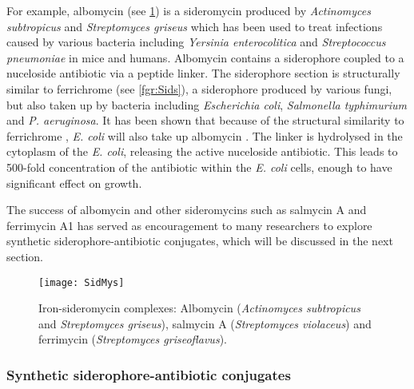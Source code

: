 For example, albomycin  (see \ref{fgr:SidMys}) is a sideromycin produced by \textit{Actinomyces subtropicus} and \textit{Streptomyces griseus}\cite{Hartmann1979,Fiedler1985} which has been used to treat infections caused by various bacteria including \textit{Yersinia enterocolitica} and \textit{Streptococcus pneumoniae} in mice and humans\cite{Gause1955,Pramanik2007}. 
Albomycin  contains a siderophore coupled to a nuceloside antibiotic via a peptide linker. 
The siderophore section is structurally similar to ferrichrome  (see \ref{fgr:Sids}), a siderophore produced by various fungi, but also taken up by bacteria including \textit{Escherichia coli}, \textit{Salmonella typhimurium} and \textit{P. aeruginosa}\cite{vanderHelm1980,Hannauer2010}.
It has been shown that because of the structural similarity to ferrichrome , \textit{E. coli} will also take up albomycin \cite{Hartmann1979}.
The linker is hydrolysed in the cytoplasm of the \textit{E. coli}, releasing the active nuceloside antibiotic. This leads to 500-fold concentration of the antibiotic within the \textit{E. coli} cells, enough to have significant effect on growth.

The success of albomycin\cite{Gause1955} and other sideromycins such as salmycin A\cite{Hider2010,Vertesy1995,Braun2009} and ferrimycin A1\cite{Sackmann1962,Gottlieb2012} has served as encouragement to many researchers to explore synthetic siderophore-antibiotic conjugates, which will be discussed in the next section. 

\begin{figure}[H]
	\begin{center}
		\texttt{[image: SidMys]}
		\caption{Iron-sideromycin complexes: Albomycin \cite{Benz1982,Hider2010} (\textit{Actinomyces subtropicus} and \textit{Streptomyces griseus}), salmycin A\cite{Hider2010,Vertesy1995,Braun2009} (\textit{Streptomyces violaceus}) and ferrimycin\cite{Hider2010} (\textit{Streptomyces griseoflavus}). \label{fgr:SidMys}}
	\end{center}
\end{figure}

\subsubsection{Synthetic siderophore-antibiotic conjugates\label{sec:synthsidABs}}

